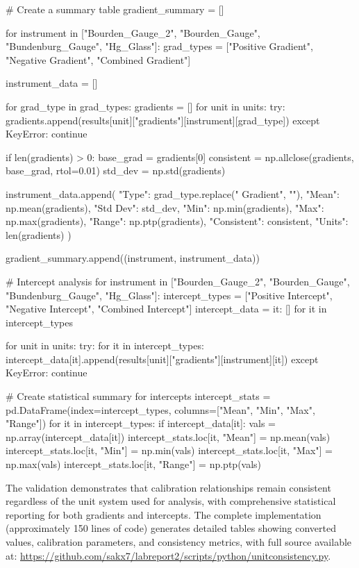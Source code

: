\documentclass{article}
\begin{document}
\begin{python}
# Create a summary table
gradient_summary = []

for instrument in ["Bourden_Gauge_2", "Bourden_Gauge", "Bundenburg_Gauge", "Hg_Glass"]:
    grad_types = ["Positive Gradient", "Negative Gradient", "Combined Gradient"]
    
    instrument_data = []
    
    for grad_type in grad_types:
        gradients = []
        for unit in units:
            try:
                gradients.append(results[unit]["gradients"][instrument][grad_type])
            except KeyError:
                continue
        
        if len(gradients) > 0:
            base_grad = gradients[0]
            consistent = np.allclose(gradients, base_grad, rtol=0.01)
            std_dev = np.std(gradients)
            
            instrument_data.append({
                "Type": grad_type.replace(" Gradient", ""),
                "Mean": np.mean(gradients),
                "Std Dev": std_dev,
                "Min": np.min(gradients),
                "Max": np.max(gradients),
                "Range": np.ptp(gradients),
                "Consistent": consistent,
                "Units": len(gradients)
            })
    
    gradient_summary.append((instrument, instrument_data))

# Intercept analysis
for instrument in ["Bourden_Gauge_2", "Bourden_Gauge", "Bundenburg_Gauge", "Hg_Glass"]:
    intercept_types = ["Positive Intercept", "Negative Intercept", "Combined Intercept"]
    intercept_data = {it: [] for it in intercept_types}
    
    for unit in units:
        try:
            for it in intercept_types:
                intercept_data[it].append(results[unit]["gradients"][instrument][it])
        except KeyError:
            continue
    
    # Create statistical summary for intercepts
    intercept_stats = pd.DataFrame(index=intercept_types, 
                                 columns=["Mean", "Min", "Max", "Range"])
    for it in intercept_types:
        if intercept_data[it]:
            vals = np.array(intercept_data[it])
            intercept_stats.loc[it, "Mean"] = np.mean(vals)
            intercept_stats.loc[it, "Min"] = np.min(vals)
            intercept_stats.loc[it, "Max"] = np.max(vals)
            intercept_stats.loc[it, "Range"] = np.ptp(vals)
\end{python}

The validation demonstrates that calibration relationships remain consistent regardless of the unit system used for analysis, with comprehensive statistical reporting for both gradients and intercepts. The complete implementation (approximately 150 lines of code) generates detailed tables showing converted values, calibration parameters, and consistency metrics, with full source available at: \href{https://github.com/sakx7/labreport2/blob/4dd8dd074731e6d3836b0b4de715392487fdd1c8/scripts/python/unitconsistency.py}{https://github.com/sakx7/labreport2/scripts/python/unitconsistency.py}.
\end{document}
